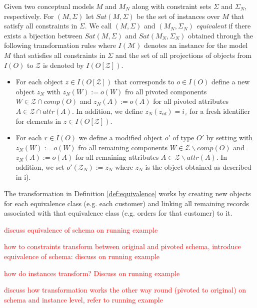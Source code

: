 \documentclass[sigconf]{acmart}
\begin{document}
\begin{definition}
\label{def:equivalence} Given two conceptual models $M$ and $M_N$ along with constraint sets $\Sigma$ and $\Sigma_N$, respectively. For $(M,\Sigma)$ let $Sat(M, \Sigma)$ be the set of instances over $M$ that satisfy all constraints in $\Sigma$. We call $(M, \Sigma)$ and $(M_N,\Sigma_N)$ \emph{equivalent} if there exists a bijection between $Sat(M, \Sigma)$ and $Sat(M_N, \Sigma_N)$ obtained through the following transformation rules where $I(\mathcal{M})$ denotes an instance for the model $M$ that satisfies all constraints in $\Sigma$ and the set of all projections of objects from $I(O)$ to $\mathcal{Z}$ is denoted by $I(O[\mathcal{Z}])$.
\begin{itemize}
    \item[i)] For each object $z \in I(O[\mathcal{Z}])$ that corresponds to $o \in I(O)$ define a new object $z_N$ with $z_N(W) := o(W)$ fro all pivoted components $W \in \mathcal{Z} \cap comp(O)$ and $z_N(A) := o(A)$ for all pivoted attributes $A \in \mathcal{Z} \cap attr(A)$. In addition, we define $z_N(z_{id}) = i_z$ for a fresh identifier for elements in $z \in I(O[\mathcal{Z}])$.
    \item[ii)] For each $r \in I(O)$ we define a modified object $o'$ of type $O'$ by setting with $z_N(W) := o(W)$ fro all remaining components $W \in \mathcal{Z} \backslash comp(O)$ and $z_N(A) := o(A)$ for all remaining attributes $A \in \mathcal{Z} \backslash attr(A)$. In addition, we set $o'(\mathcal{Z}_N) := z_N$ where $z_N$ is the object obtained as described in i).
\end{itemize}
\end{definition}

The transformation in Definition \ref{def:equivalence} works by creating new objects for each equivalence class (e.g. each customer) and linking all remaining records associated with that equivalence class (e.g. orders for that customer) to it.



\textcolor{red}{discuss equivalence of schema on running example}


\textcolor{red}{how to constraints transform between original and pivoted schema, introduce equivalence of schema: discuss on running example}

\textcolor{red}{how do instances transform? Discuss on running example}

\textcolor{red}{discuss how transformation works the other way round (pivoted to original) on schema and instance level, refer to running example}
\end{document}
